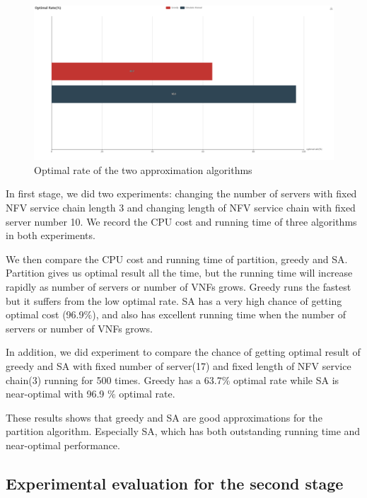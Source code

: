 \documentclass{acmtog}
\begin{document}
\begin{figure}[!h]
\centerline{\includegraphics[scale=0.28]{7.png}}
\caption{Optimal rate of the two approximation algorithms}
\label{fig: Optimal rate of the two approximation algorithms}
\end{figure}


In first stage, we did two experiments: changing the number of servers with fixed NFV service chain length 3 and changing length of NFV service chain with fixed server number 10. We record the CPU cost and running time of three algorithms in both experiments.

We then compare the CPU cost and running time of partition, greedy and SA. Partition gives us optimal result all the time, but the running time will increase rapidly as number of servers or number of VNFs grows. Greedy runs the fastest but it suffers from the low optimal rate. SA has a very high chance of getting optimal cost (96.9$\%$), and also has excellent running time when the number of servers or number of VNFs grows.


In addition, we did experiment to compare the chance of getting optimal result of greedy and SA with fixed number of server(17) and fixed length of NFV service chain(3) running for 500 times. Greedy has a 63.7$\%$ optimal rate while SA is near-optimal with 96.9 $\%$ optimal rate.

These results shows that greedy and SA are good approximations for the partition algorithm. Especially SA, which has both outstanding running time and near-optimal performance.

\subsection{Experimental evaluation for the second stage}
\end{document}
